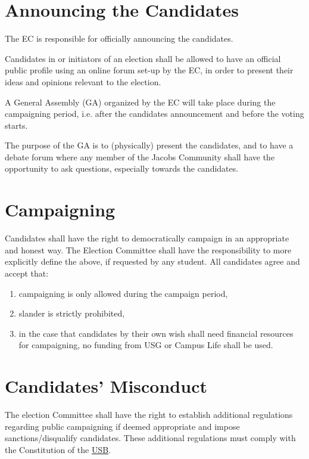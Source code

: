 \section{Announcing the Candidates}
The EC is responsible for officially announcing the candidates.
\begin{parenum}
\item
Candidates in or initiators of an election shall be allowed to have an official public profile using an online forum set-up by the EC, in order to present their ideas and opinions relevant to the election.
\item
A General Assembly (GA) organized by the EC will take place during the campaigning period, i.e. after the candidates announcement and before the voting starts.
\item
The purpose of the GA is to (physically) present the candidates, and to have a debate forum where any member of the Jacobs Community shall have the opportunity to ask questions, especially towards the candidates.
\end{parenum}

\section{Campaigning}
Candidates shall have the right to democratically campaign in an appropriate and honest way. The Election Committee shall have the responsibility to more explicitly define the above, if requested by any student. All candidates agree and accept that:
\begin{enumerate}[nosep] 
\item
campaigning is only allowed during the campaign period,
\item
slander is strictly prohibited,
\item
in the case that candidates by their own wish shall need financial resources for campaigning, no funding from USG or Campus Life shall be used.
\end{enumerate}


\section{Candidates' Misconduct} 
The election Committee shall have the right to establish additional regulations regarding public campaigning if deemed appropriate and impose sanctions/disqualify candidates. These additional regulations must comply with the Constitution of the \hyperref[studentbody]{USB}.

